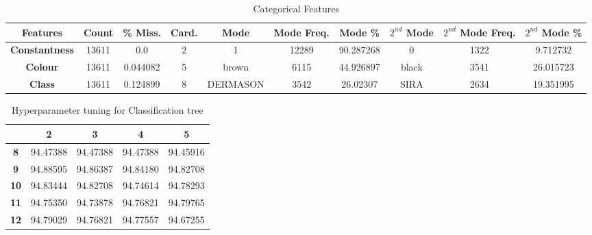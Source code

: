 \documentclass[10pt, conference]{IEEEtran}
\begin{document}
\begin{table}[h!]
    \caption{Categorical Features}
    \begin{center}
    \begin{tabular}{|c||c|c|c|c|c|c|c|c|c|}
        \hline
        \textbf{Features}&\textbf{Count}&\textbf{\% Miss.}&\textbf{Card.}&\textbf{Mode}&\textbf{Mode Freq.}&\textbf{Mode \%}&\textbf{$2^{nd}$ Mode}&\textbf{$2^{nd}$ Mode Freq.}&\textbf{$2^{nd}$ Mode \%}\\
        \hline
        \textbf{Constantness}       &13611  &0.0       &2       &1        &12289      &90.287268     &0          &1322         &9.712732\\
        \textbf{Colour}             &13611  &0.044082  &5       &brown    &6115       &44.926897    &black      &3541          &26.015723\\
        \textbf{Class}              &13611  &0.124899  &8       &DERMASON &3542       &26.02307     &SIRA       &2634          &19.351995\\

        \hline
    \end{tabular}
    \label{categorical features}
    \end{center}
\end{table}

\begin{table}[h!]
    \caption{Hyperparameter tuning for Classification tree}
    \begin{center}
        \begin{tabular}{|c||c|c|c|c|}
                        & \textbf{2} & \textbf{3} & \textbf{4} & \textbf{5} \\
            \hline
            \textbf{8}  & 94.47388 & 94.47388 & 94.47388 & 94.45916\\
            \textbf{9}  & 94.88595 & 94.86387 & 94.84180 & 94.82708\\
            \textbf{10} & 94.83444 & 94.82708 & 94.74614 & 94.78293\\
            \textbf{11} & 94.75350 & 94.73878 & 94.76821 & 94.79765\\
            \textbf{12} & 94.79029 & 94.76821 & 94.77557 & 94.67255\\
        \end{tabular}
    \end{center}
\end{table}

\end{document}
